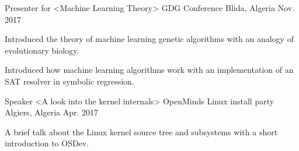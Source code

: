 

\begin{cventries}

  \cventry
    {Presenter for <Machine Learning Theory>} %
    {GDG Conference} %
    {Blida, Algeria} %
    {Nov. 2017} %
    {
      \begin{cvitems} %
        \item {Introduced the theory of machine learning genetic algorithms with an analogy of evolutionary biology.}
        \item {Introduced how machine learning algorithms work with an implementation of an SAT resolver in symbolic regression.}
      \end{cvitems}
    }

  \cventry
    {Speaker <A look into the kernel internals>} %
    {OpenMinds Linux install party} %
    {Algiers, Algeria} %
    {Apr. 2017} %
    {
      \begin{cvitems} %
        \item {A brief talk about the Linux kernel source tree and subsystems with a short introduction to OSDev.}
      \end{cvitems}
    }

\end{cventries}
